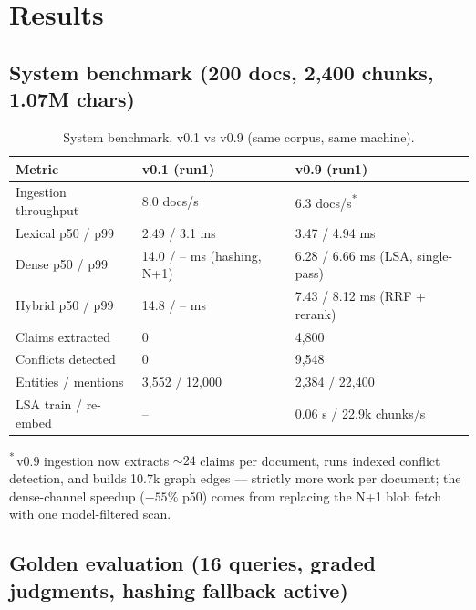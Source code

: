
\needspace{0.2\textheight}
\section{Results}\label{sec:results}

\subsection{System benchmark (200 docs, 2,400 chunks, 1.07M chars)}\label{sec:sysbench}

\begin{table}[htbp]
\centering
\caption{System benchmark, v0.1 vs v0.9 (same corpus, same machine).}
\label{tab:sysbench}
\footnotesize
\begin{tabular*}{\columnwidth}{@{\extracolsep{\fill}} l l l}
\toprule
Metric & v0.1 (run1) & v0.9 (run1) \\
\midrule
Ingestion throughput & 8.0 docs/s & 6.3 docs/s\textsuperscript{*} \\
Lexical p50 / p99 & 2.49 / 3.1 ms & 3.47 / 4.94 ms \\
Dense p50 / p99 & 14.0 / -- ms (hashing, N+1) & 6.28 / 6.66 ms (LSA, single-pass) \\
Hybrid p50 / p99 & 14.8 / -- ms & 7.43 / 8.12 ms (RRF + rerank) \\
Claims extracted & 0 & 4,800 \\
Conflicts detected & 0 & 9,548 \\
Entities / mentions & 3,552 / 12,000 & 2,384 / 22,400 \\
LSA train / re-embed & -- & 0.06 s / 22.9k chunks/s \\
\bottomrule
\end{tabular*}

\vspace{0.35em}
\begin{minipage}{0.92\columnwidth}
\footnotesize\textsuperscript{*}\,v0.9 ingestion now extracts ${\sim}24$ claims per
document, runs indexed conflict detection, and builds 10.7k graph edges ---
strictly more work per document; the dense-channel speedup ($-55\%$ p50) comes
from replacing the N+1 blob fetch with one model-filtered scan.
\end{minipage}
\end{table}

\subsection{Golden evaluation (16 queries, graded judgments, hashing fallback active)}\label{sec:goldenresults}

